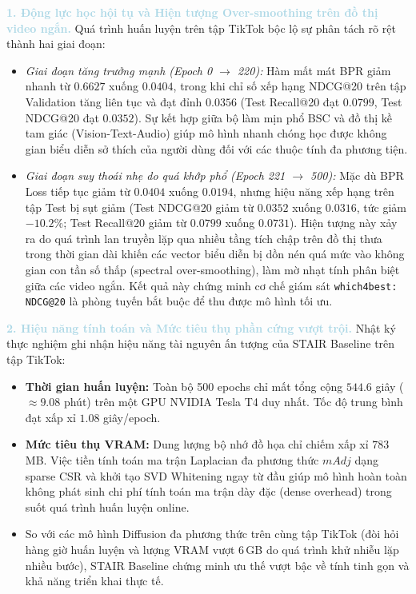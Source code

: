 \noindent\textcolor{lightblue}{\textbf{1. Động lực học hội tụ và Hiện tượng Over-smoothing trên đồ thị video ngắn.}}
Quá trình huấn luyện trên tập TikTok bộc lộ sự phân tách rõ rệt thành hai giai đoạn:
\begin{itemize}[leftmargin=*]
    \item \textit{Giai đoạn tăng trưởng mạnh (Epoch 0 $\to$ 220):} Hàm mất mát BPR giảm nhanh từ $0.6627$ xuống $0.0404$, trong khi chỉ số xếp hạng NDCG@20 trên tập Validation tăng liên tục và đạt đỉnh $0.0356$ (Test Recall@20 đạt $0.0799$, Test NDCG@20 đạt $0.0352$). Sự kết hợp giữa bộ làm mịn phổ BSC và đồ thị kề tam giác (Vision-Text-Audio) giúp mô hình nhanh chóng học được không gian biểu diễn sở thích của người dùng đối với các thuộc tính đa phương tiện.
    \item \textit{Giai đoạn suy thoái nhẹ do quá khớp phổ (Epoch 221 $\to$ 500):} Mặc dù BPR Loss tiếp tục giảm từ $0.0404$ xuống $0.0194$, nhưng hiệu năng xếp hạng trên tập Test bị sụt giảm (Test NDCG@20 giảm từ $0.0352$ xuống $0.0316$, tức giảm $-10.2\%$; Test Recall@20 giảm từ $0.0799$ xuống $0.0731$). Hiện tượng này xảy ra do quá trình lan truyền lặp qua nhiều tầng tích chập trên đồ thị thưa trong thời gian dài khiến các vector biểu diễn bị dồn nén quá mức vào không gian con tần số thấp (spectral over-smoothing), làm mờ nhạt tính phân biệt giữa các video ngắn. Kết quả này chứng minh cơ chế giám sát \texttt{which4best: NDCG@20} là phòng tuyến bắt buộc để thu được mô hình tối ưu.
\end{itemize}

\noindent\textcolor{lightblue}{\textbf{2. Hiệu năng tính toán và Mức tiêu thụ phần cứng vượt trội.}}
Nhật ký thực nghiệm ghi nhận hiệu năng tài nguyên ấn tượng của STAIR Baseline trên tập TikTok:
\begin{itemize}[leftmargin=*]
    \item \textbf{Thời gian huấn luyện:} Toàn bộ 500 epochs chỉ mất tổng cộng $544.6$ giây ($\approx 9.08$ phút) trên một GPU NVIDIA Tesla T4 duy nhất. Tốc độ trung bình đạt xấp xỉ $1.08$ giây/epoch.
    \item \textbf{Mức tiêu thụ VRAM:} Dung lượng bộ nhớ đồ họa chỉ chiếm xấp xỉ $783$\,MB. Việc tiền tính toán ma trận Laplacian đa phương thức $mAdj$ dạng sparse CSR và khởi tạo SVD Whitening ngay từ đầu giúp mô hình hoàn toàn không phát sinh chi phí tính toán ma trận dày đặc (dense overhead) trong suốt quá trình huấn luyện online.
    \item So với các mô hình Diffusion đa phương thức trên cùng tập TikTok (đòi hỏi hàng giờ huấn luyện và lượng VRAM vượt $6$\,GB do quá trình khử nhiễu lặp nhiều bước), STAIR Baseline chứng minh ưu thế vượt bậc về tính tinh gọn và khả năng triển khai thực tế.
\end{itemize}

